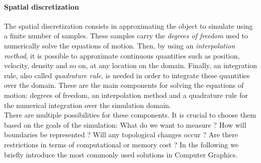\paragraph{Spatial discretization}
The spatial discretization consists in approximating the object to simulate using a finite number of samples. 
These samples carry the \emph{degrees of freedom} used to numerically solve the equations of motion.
Then, by using an \emph{interpolation method}, it is possible to approximate continuous quantities such as position, velocity, density and so on, at any location on the domain. 
Finally, an integration rule, also called \emph{quadrature rule}, is needed in order to integrate these quantities over the domain. 
These are the main components for solving the equations of motion:
degrees of freedom, an interpolation method and a quadrature rule for the numerical integration over the simulation domain.
\\
There are multiple possibilities for these components. It is crucial to choose them based on the goals of the simulation: What do we want to measure ? How will boundaries be represented ? Will any topological changes occur ? Are there restrictions in terms of computational or memory cost ? In the following we briefly introduce the most commonly used solutions in Computer Graphics.

